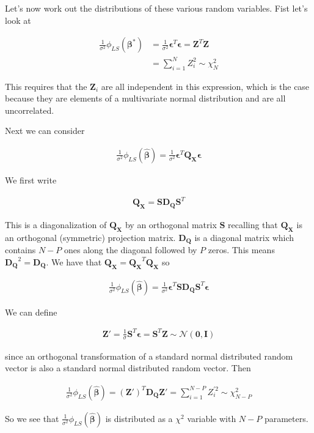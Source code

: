 \documentclass[12pt]{article}
\newcommand{\ep}{\epsilon}
\newcommand{\bv}[1]{\boldsymbol{#1}}
\begin{document}
Let's now work out the distributions of these various random variables. Fist let's look at

\begin{align}
\frac{1}{\sigma^2}\phi_{LS}(\bv{\beta^*}) &= \frac{1}{\sigma^2}\bv{\ep}^T\bv{\ep} = \bv{Z}^T\bv{Z}\\
&= \sum_{i=1}^N Z_i^2 \sim \chi^2_N
\end{align}

This requires that the $\bv{Z}_i$ are all independent in this expression, which is the case because they are elements of a multivariate normal distribution and are all uncorrelated.

Next we can consider

\begin{align}
\frac{1}{\sigma^2}\phi_{LS}(\bv{\hat{\beta}}) = \frac{1}{\sigma^2} \bv{\ep}^T\bv{Q_X}\bv{\ep}
\end{align}

We first write

\begin{align}
\bv{Q_X} = \bv{S}\bv{D_Q}\bv{S}^T
\end{align}

This is a diagonalization of $\bv{Q_X}$ by an orthogonal matrix $\bv{S}$ recalling that $\bv{Q_X}$ is an orthogonal (symmetric) projection matrix.
$\bv{D_Q}$ is a diagonal matrix which contains $N-P$ ones along the diagonal followed by $P$ zeros.
This means $\bv{D_Q}^2 = \bv{D_Q}$.
We have that $\bv{Q_X} = \bv{Q_X}^T\bv{Q_X}$ so

\begin{align}
\frac{1}{\sigma^2}\phi_{LS}(\bv{\hat{\beta}}) = \frac{1}{\sigma^2} \bv{\ep}^T\bv{S}\bv{D_Q}\bv{S}^T\bv{\ep}
\end{align}

We can define

\begin{align}
\bv{Z}' = \frac{1}{\sigma}\bv{S}^T\bv{\ep} = \bv{S}^T\bv{Z} \sim \mathcal{N}(\bv{0},\bv{I})
\end{align}

since an orthogonal transformation of a standard normal distributed random vector is also a standard normal distributed random vector.
Then

\begin{align}
\frac{1}{\sigma^2}\phi_{LS}(\bv{\hat{\beta}}) = (\bv{Z}')^T\bv{D_Q}\bv{Z}' = \sum_{i=1}^{N-P} Z_i^{'2} \sim \chi^2_{N-P}
\end{align}

So we see that $\frac{1}{\sigma^2}\phi_{LS}(\bv{\hat{\beta}})$  is distributed as a $\chi^2$ variable with $N-P$ parameters.
\end{document}
